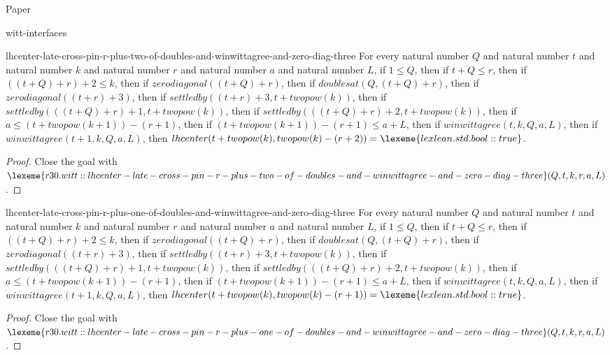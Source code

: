 \begin{lexlean}{Paper}
\begin{section}{witt-interfaces}
  \begin{theorem}{lhcenter-late-cross-pin-r-plus-two-of-doubles-and-winwittagree-and-zero-diag-three}
  For every natural number \(Q\) and natural number \(t\) and natural number \(k\) and natural number \(r\) and natural number \(a\) and natural number \(L\), if \(1 ≤ Q\), then if \(t + Q ≤ r\), then if \(((t + Q) + r) + 2 ≤ k\), then if \(zerodiagonal((t + Q) + r)\), then if \(doublesat(Q, (t + Q) + r)\), then if \(zerodiagonal((t + r) + 3)\), then if \(settledby((t + r) + 3, t + twopow(k))\), then if \(settledby(((t + Q) + r) + 1, t + twopow(k))\), then if \(settledby(((t + Q) + r) + 2, t + twopow(k))\), then if \(a ≤ (t + twopow(k + 1)) - (r + 1)\), then if \((t + twopow(k + 1)) - (r + 1) ≤ a + L\), then if \(winwittagree(t, k, Q, a, L)\), then if \(winwittagree(t + 1, k, Q, a, L)\), then \(lhcenter(t + twopow(k), twopow(k) - (r + 2)) = \lexeme{lexlean.std.bool::true}\).
  \begin{proof}
  Close the goal with \(\lexeme{r30.witt::lhcenter-late-cross-pin-r-plus-two-of-doubles-and-winwittagree-and-zero-diag-three}(Q, t, k, r, a, L)\).
  \end{proof}
  \end{theorem}

  \begin{theorem}{lhcenter-late-cross-pin-r-plus-one-of-doubles-and-winwittagree-and-zero-diag-three}
  For every natural number \(Q\) and natural number \(t\) and natural number \(k\) and natural number \(r\) and natural number \(a\) and natural number \(L\), if \(1 ≤ Q\), then if \(t + Q ≤ r\), then if \(((t + Q) + r) + 2 ≤ k\), then if \(zerodiagonal((t + Q) + r)\), then if \(doublesat(Q, (t + Q) + r)\), then if \(zerodiagonal((t + r) + 3)\), then if \(settledby((t + r) + 3, t + twopow(k))\), then if \(settledby(((t + Q) + r) + 1, t + twopow(k))\), then if \(settledby(((t + Q) + r) + 2, t + twopow(k))\), then if \(a ≤ (t + twopow(k + 1)) - (r + 1)\), then if \((t + twopow(k + 1)) - (r + 1) ≤ a + L\), then if \(winwittagree(t, k, Q, a, L)\), then if \(winwittagree(t + 1, k, Q, a, L)\), then \(lhcenter(t + twopow(k), twopow(k) - (r + 1)) = \lexeme{lexlean.std.bool::true}\).
  \begin{proof}
  Close the goal with \(\lexeme{r30.witt::lhcenter-late-cross-pin-r-plus-one-of-doubles-and-winwittagree-and-zero-diag-three}(Q, t, k, r, a, L)\).
  \end{proof}
  \end{theorem}


\end{section}
\end{lexlean}
